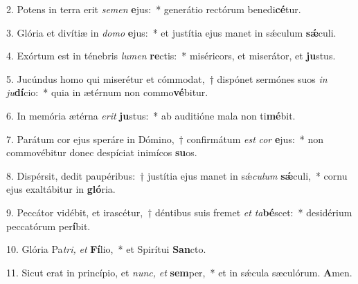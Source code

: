 \item 2. Potens in terra erit \textit{se}\textit{men} \textbf{e}jus:~* generátio rectórum benedi\textbf{cé}tur.
\item 3. Glória et divítiæ in \textit{do}\textit{mo} \textbf{e}jus:~* et justítia ejus manet in sǽculum \textbf{sǽ}culi.
\item 4. Exórtum est in ténebris \textit{lu}\textit{men} \textbf{re}ctis:~* miséricors, et miserátor, et \textbf{ju}stus.
\item 5. Jucúndus homo qui miserétur et cómmodat,~† dispónet sermónes suos \textit{in} \textit{ju}\textbf{dí}cio:~* quia in ætérnum non commo\textbf{vé}bitur.
\item 6. In memória ætérna \textit{e}\textit{rit} \textbf{ju}stus:~* ab auditióne mala non ti\textbf{mé}bit.
\item 7. Parátum cor ejus speráre in Dómino,~† confirmátum \textit{est} \textit{cor} \textbf{e}jus:~* non commovébitur donec despíciat inimícos \textbf{su}os.
\item 8. Dispérsit, dedit paupéribus:~† justítia ejus manet in sǽ\textit{cu}\textit{lum} \textbf{sǽ}culi,~* cornu ejus exaltábitur in \textbf{gló}ria.
\item 9. Peccátor vidébit, et irascétur,~† déntibus suis fremet \textit{et} \textit{ta}\textbf{bé}scet:~* desidérium peccatórum per\textbf{í}bit.
\item 10. Glória Pa\hspace{0.03em}\textit{tri,} \textit{et} \textbf{Fí}lio,~* et Spirítui \textbf{San}cto.
\item 11. Sicut erat in princípio, et \textit{nunc,} \textit{et} \textbf{sem}per,~* et in sǽcula sæculórum. \textbf{A}men.
